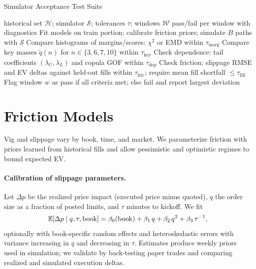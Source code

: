 \begin{algorithm}[t]
  \caption{Simulator Acceptance Test Suite}
  \label{alg:sim-accept}
  \begin{algorithmic}[1]
    \Require historical set $\mathcal H$; simulator $\mathcal S$; tolerances $\tau$; windows $\mathcal W$
    \Ensure pass/fail per window with diagnostics
      \State Fit models on train portion; calibrate friction priors; simulate $B$ paths with $\mathcal S$
      \State Compare histograms of margins/scores: $\chi^2$ or EMD within $\tau_{\text{marg}}$
      \State Compare key masses $\tilde q(n)$ for $n\in\{3,6,7,10\}$ within $\tau_{\text{key}}$
      \State Check dependence: tail coefficients $(\lambda_U,\lambda_L)$ and copula GOF within $\tau_{\text{dep}}$
      \State Check friction: slippage RMSE and EV deltas against held‑out fills within $\tau_{\text{fric}}$; require mean fill shortfall $\le \tau_{\text{fill}}$
      \State Flag window $w$ as pass if all criteria met; else fail and report largest deviation
    \EndFor
  \end{algorithmic}
\end{algorithm}

\section{Friction Models}
Vig and slippage vary by book, time, and market. We parameterize friction with priors learned from historical fills and allow pessimistic and optimistic regimes to bound expected EV.

\paragraph{Calibration of slippage parameters.}
Let $\Delta p$ be the realized price impact (executed price minus quoted), $q$ the order size as a fraction of posted limits, and $\tau$ minutes to kickoff. We fit
\[\mathbb{E}[\Delta p\mid q,\tau,\text{book}]=\beta_0(\text{book})+\beta_1\,q+\beta_2\,q^2+\beta_3\,\tau^{-1},\]
optionally with book‑specific random effects and heteroskedastic errors with variance increasing in $q$ and decreasing in $\tau$. Estimates produce weekly priors used in simulation; we validate by back‑testing paper trades and comparing realized and simulated execution deltas.

